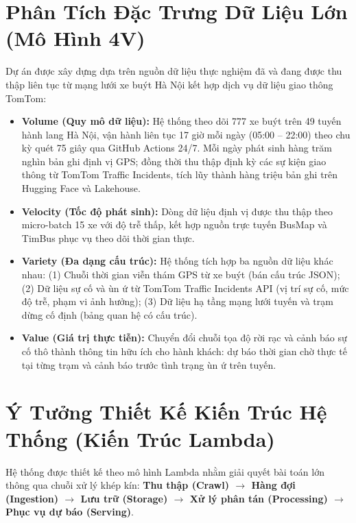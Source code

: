 \documentclass[11pt,a4paper]{article}
\begin{document}
\section{Phân Tích Đặc Trưng Dữ Liệu Lớn (Mô Hình 4V)}
Dự án được xây dựng dựa trên nguồn dữ liệu thực nghiệm đã và đang được thu thập liên tục từ mạng lưới xe buýt Hà Nội kết hợp dịch vụ dữ liệu giao thông TomTom:
\begin{itemize}[leftmargin=*,noitemsep,topsep=1.5pt]
    \item \textbf{Volume (Quy mô dữ liệu):} Hệ thống theo dõi 777 xe buýt trên 49 tuyến hành lang Hà Nội, vận hành liên tục 17 giờ mỗi ngày (05:00 -- 22:00) theo chu kỳ quét 75 giây qua GitHub Actions 24/7. Mỗi ngày phát sinh hàng trăm nghìn bản ghi định vị GPS; đồng thời thu thập định kỳ các sự kiện giao thông từ TomTom Traffic Incidents, tích lũy thành hàng triệu bản ghi trên Hugging Face và Lakehouse.
    \item \textbf{Velocity (Tốc độ phát sinh):} Dòng dữ liệu định vị được thu thập theo micro-batch 15 xe với độ trễ thấp, kết hợp nguồn trực tuyến BusMap và TimBus phục vụ theo dõi thời gian thực.
    \item \textbf{Variety (Đa dạng cấu trúc):} Hệ thống tích hợp ba nguồn dữ liệu khác nhau: (1) Chuỗi thời gian viễn thám GPS từ xe buýt (bán cấu trúc JSON); (2) Dữ liệu sự cố và ùn ứ từ TomTom Traffic Incidents API (vị trí sự cố, mức độ trễ, phạm vi ảnh hưởng); (3) Dữ liệu hạ tầng mạng lưới tuyến và trạm dừng cố định (bảng quan hệ có cấu trúc).
    \item \textbf{Value (Giá trị thực tiễn):} Chuyển đổi chuỗi tọa độ rời rạc và cảnh báo sự cố thô thành thông tin hữu ích cho hành khách: dự báo thời gian chờ thực tế tại từng trạm và cảnh báo trước tình trạng ùn ứ trên tuyến.
\end{itemize}

\section{Ý Tưởng Thiết Kế Kiến Trúc Hệ Thống (Kiến Trúc Lambda)}
Hệ thống được thiết kế theo mô hình Lambda nhằm giải quyết bài toán lớn thông qua chuỗi xử lý khép kín: \textbf{Thu thập (Crawl) $\to$ Hàng đợi (Ingestion) $\to$ Lưu trữ (Storage) $\to$ Xử lý phân tán (Processing) $\to$ Phục vụ dự báo (Serving)}.
\end{document}
